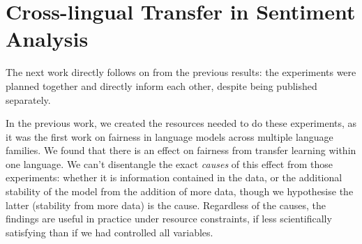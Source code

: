 \chapter{Cross-lingual Transfer in Sentiment Analysis}
\label{chapter:multilingual_sentiment_analysis_pt2}

The next work directly follows on from the previous results: the experiments were planned together and directly inform each other, despite being published separately. 

In the previous work, we created the resources needed to do these experiments, as it was the first work on fairness in language models across multiple language families. We found that there is an effect on fairness from transfer learning within one language. We can't disentangle the exact \textit{causes} of this effect from those experiments: whether it is information contained in the data, or the additional stability of the model from the addition of more data, though we hypothesise the latter (stability from more data) is the cause. Regardless of the causes, the findings are useful in practice under resource constraints, if less scientifically satisfying than if we had controlled all variables. 

